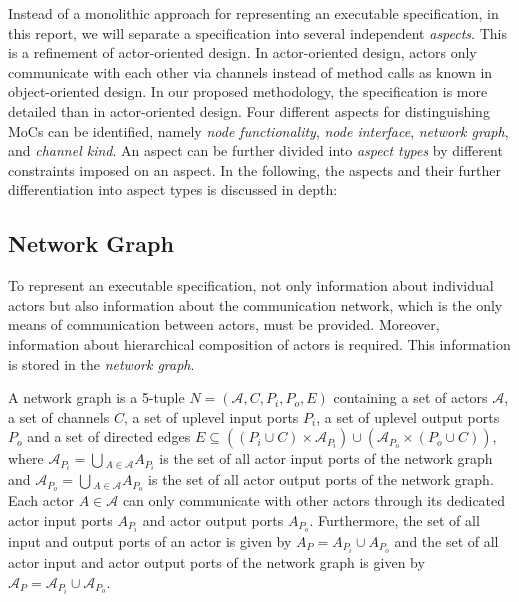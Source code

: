 Instead of a monolithic approach for representing an executable specification,
in this report, we will separate a specification into several
independent \emph{aspects}.
This is a refinement of actor-oriented design.
In actor-oriented design, actors only
communicate with each other via channels instead of method calls as known
in object-oriented design. In our proposed methodology, the specification is more
detailed than in actor-oriented design.
Four different aspects for distinguishing MoCs can be identified,
namely \emph{node functionality}, \emph{node interface}, \emph{network graph}, and
\emph{channel kind}. An aspect can be further divided into
\emph{aspect types} by different constraints imposed on an aspect.
In the following, the aspects and their further
differentiation into aspect types is discussed in depth:

\subsection{Network Graph}\label{network-graph} 

To represent an executable specification, not only information about
individual actors but also information about the communication network,
which is the only means of communication between actors,
must be provided. Moreover, information about hierarchical
composition of actors is required. This information is stored in
the \emph{network graph}.

\begin{definition}
A network graph is a 5-tuple $N=(\mathcal{A},C,P_{i},P_{o},E)$ containing
a set of actors $\mathcal{A}$, a set of channels $C$, a set of uplevel
input ports $P_{i}$, a set of uplevel output ports $P_{o}$ and a set of
directed edges $E \subseteq ((P_{i} \cup C) \times \mathcal{A}_{P_{i}})
\cup (\mathcal{A}_{P_{o}} \times (P_{o} \cup C))$, where
$\mathcal{A}_{P_{i}} = \bigcup{}_{A \in \mathcal{A}} A_{P_{i}}$
is the set of all actor input ports of the network graph and
$\mathcal{A}_{P_{o}} = \bigcup{}_{A \in \mathcal{A}} A_{P_{o}}$
is the set of all actor output ports of the network graph.
Each actor $A \in \mathcal{A}$ can only communicate with other actors
through its dedicated actor input ports $A_{P_{i}}$ and
actor output ports $A_{P_{o}}$.
Furthermore, the set of all input and output ports of an actor
is given by $A_{P} = A_{P_{i}} \cup A_{P_{o}}$ and
the set of all actor input and actor output ports of the network graph
is given by $\mathcal{A}_{P} = \mathcal{A}_{P_{i}} \cup \mathcal{A}_{P_{o}}$.

\end{definition}

